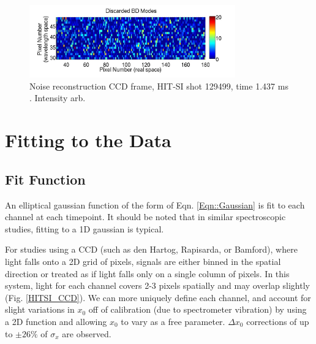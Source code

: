 \begin{center}
\begin{figure}
\end{figure}
\begin{figure}
\includegraphics[width=3.5in]{BD_Discard}\caption{Noise reconstruction CCD frame, HIT-SI shot 129499, time 1.437 ms \cite{hossack2015study}. Intensity arb.}\label{BD Noise}
\end{figure}
\end{center}




\section{Fitting to the Data}\label{sec:Fit}
\subsection{Fit Function}
An elliptical gaussian function of the form of Eqn. \ref{Eqn::Gaussian} is fit to each channel at each timepoint. It should be noted that in similar spectroscopic studies, fitting to a 1D gaussian is typical. 
For studies using a CCD (such as den Hartog\cite{den1994fast}, Rapisarda\cite{rapisarda2007role}, or Bamford\cite{bamford1992combination}), where light falls onto a 2D grid of pixels, signals are either binned in the spatial direction or treated as if light falls only on a single column of pixels. In this system, light for each channel covers 2-3 pixels spatially and may overlap slightly (Fig. \ref{HITSI_CCD}). We can more uniquely define each channel, and account for slight variations in $x_0$ off of calibration (due to spectrometer vibration) by using a 2D function and allowing $x_0$ to vary as a free parameter. $\Delta{x_0}$ corrections of up to $\pm26\%$ of $\sigma_x$ are observed.\\



